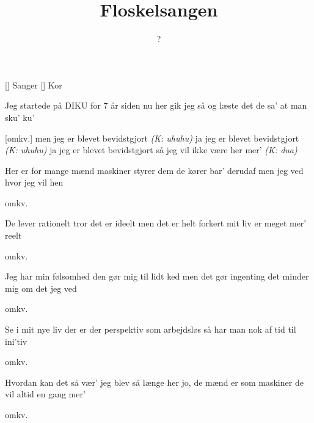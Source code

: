 \documentclass[a4paper,11pt]{article}
\title{Floskelsangen}
\author{?}
\begin{document}
\maketitle

\begin{roles}
[] Sanger
[] Kor
\end{roles}

\begin{song}
     Jeg startede på DIKU
              for 7 år siden nu
              her gik jeg så og læste
              det de sa' at man sku' ku'

    [omkv.] men jeg er blevet bevidstgjort \emph{(K: uhuhu)}
                        ja jeg er blevet bevidstgjort \emph{(K: uhuhu)}
                        ja jeg er blevet bevidstgjort
                        så jeg vil ikke være her mer' \emph{(K: dua)}

     Her er for mange mænd
              maskiner styrer dem
              de kører bar' derudaf
              men jeg ved hvor jeg vil hen

     omkv.

     De lever rationelt
              tror det er ideelt
              men det er helt forkert
              mit liv er meget mer' reelt

     omkv.

     Jeg har min følsomhed
              den gør mig til lidt ked
              men det gør ingenting
              det minder mig om det jeg ved

     omkv.

     Se i mit nye liv
              der er der perspektiv
              som arbejdsløs så har man
              nok af tid til ini'tiv

     omkv.

     Hvordan kan det så vær'
              jeg blev så længe her
              jo, de mænd er som maskiner
              de vil altid en gang mer'

     omkv.
\end{song}
\end{document}
